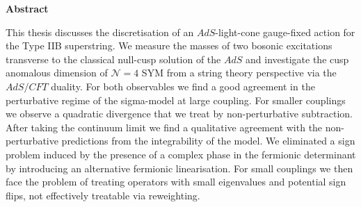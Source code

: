 %
%
\begin{center}
{\sffamily \bfseries\Large Abstract}\\
\end{center}%
\vspace{1cm}
%
This thesis discusses the discretisation of an $AdS$-light-cone gauge-fixed action for the Type IIB  superstring. We measure the masses of two bosonic excitations transverse to the classical null-cusp solution of the $AdS$  and investigate the cusp anomalous dimension of $\mathcal{N}=4$	SYM from a string theory perspective via the $AdS/CFT$ duality. For both observables we find a good agreement in the perturbative regime of the sigma-model at large  coupling. For smaller couplings we observe a quadratic divergence that we treat by non-perturbative subtraction. After taking the continuum limit we find a qualitative agreement with the non-perturbative predictions from the integrability of the model. We eliminated a sign problem induced by the presence of a complex phase in the fermionic determinant by introducing an alternative fermionic linearisation. For small couplings we then face the problem of treating operators with small eigenvalues and potential sign flips, not effectively treatable via reweighting.\\
\vspace{1.5cm}


